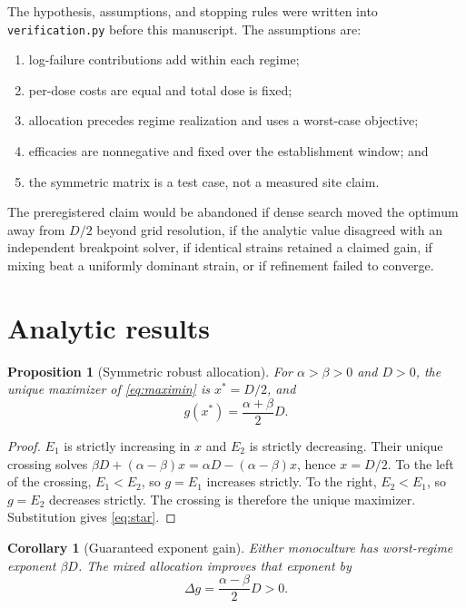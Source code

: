 \documentclass[10pt,twocolumn]{article}
\newtheorem{proposition}{Proposition}
\newtheorem{corollary}{Corollary}
\begin{document}
The hypothesis, assumptions, and stopping rules were written into
\texttt{verification.py} before this manuscript. The assumptions are:
\begin{enumerate}
\item log-failure contributions add within each regime;
\item per-dose costs are equal and total dose is fixed;
\item allocation precedes regime realization and uses a worst-case objective;
\item efficacies are nonnegative and fixed over the establishment window; and
\item the symmetric matrix is a test case, not a measured site claim.
\end{enumerate}

The preregistered claim would be abandoned if dense search moved the optimum
away from $D/2$ beyond grid resolution, if the analytic value disagreed with an
independent breakpoint solver, if identical strains retained a claimed gain,
if mixing beat a uniformly dominant strain, or if refinement failed to
converge.

\section{Analytic results}

\begin{proposition}[Symmetric robust allocation]
\label{prop:equal}
For $\alpha>\beta>0$ and $D>0$, the unique maximizer of
\eqref{eq:maximin} is $x^*=D/2$, and
\begin{equation}
 g(x^*)=\frac{\alpha+\beta}{2}D.
 \label{eq:star}
\end{equation}
\end{proposition}

\begin{proof}
$E_1$ is strictly increasing in $x$ and $E_2$ is strictly decreasing. Their
unique crossing solves
$\beta D+(\alpha-\beta)x=\alpha D-(\alpha-\beta)x$, hence $x=D/2$.
To the left of the crossing, $E_1<E_2$, so $g=E_1$ increases strictly. To the
right, $E_2<E_1$, so $g=E_2$ decreases strictly. The crossing is therefore the
unique maximizer. Substitution gives \eqref{eq:star}.
\end{proof}

\begin{corollary}[Guaranteed exponent gain]
\label{cor:gain}
Either monoculture has worst-regime exponent $\beta D$. The mixed allocation
improves that exponent by
\begin{equation}
 \Delta g=\frac{\alpha-\beta}{2}D>0.
\end{equation}
\end{corollary}
\end{document}
